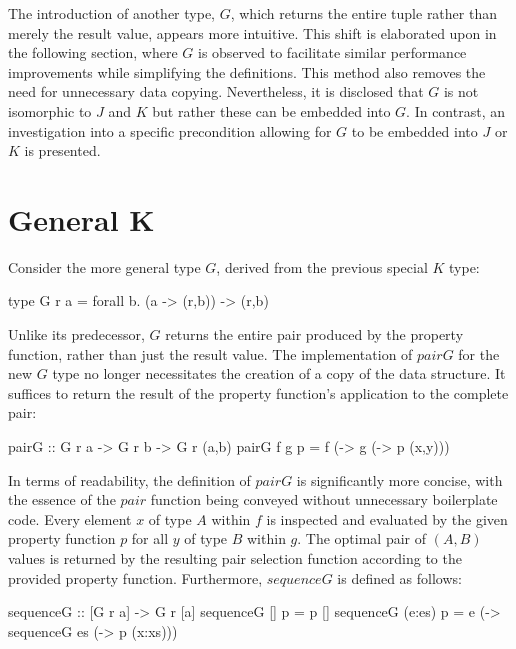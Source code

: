 \documentclass[runningheads]{llncs}
\begin{document}
\qquad The introduction of another type, \(G\), which returns the entire
tuple rather than merely the result value, appears more intuitive. This
shift is elaborated upon in the following section, where \(G\) is
observed to facilitate similar performance improvements while
simplifying the definitions. This method also removes the need for
unnecessary data copying. Nevertheless, it is disclosed that \(G\) is
not isomorphic to \(J\) and \(K\) but rather these can be embedded into
\(G\). In contrast, an investigation into a specific precondition
allowing for \(G\) to be embedded into \(J\) or \(K\) is presented.

\section{General K}\label{general-k}

Consider the more general type \(G\), derived from the previous special
\(K\) type:

\begin{code}
type G r a = forall b. (a -> (r,b)) -> (r,b)
\end{code}

Unlike its predecessor, \(G\) returns the entire pair produced by the
property function, rather than just the result value. The implementation
of \(pairG\) for the new \(G\) type no longer necessitates the creation
of a copy of the data structure. It suffices to return the result of the
property function's application to the complete pair:

\begin{code}
pairG :: G r a -> G r b -> G r (a,b)
pairG f g p = f (\x -> g (\y -> p (x,y)))
\end{code}

In terms of readability, the definition of \(pairG\) is significantly
more concise, with the essence of the \(pair\) function being conveyed
without unnecessary boilerplate code. Every element \(x\) of type \(A\)
within \(f\) is inspected and evaluated by the given property function
\(p\) for all \(y\) of type \(B\) within \(g\). The optimal pair of
\((A,B)\) values is returned by the resulting pair selection function
according to the provided property function. Furthermore, \(sequenceG\)
is defined as follows:

\begin{code}
sequenceG :: [G r a] -> G r [a]
sequenceG [] p     = p []
sequenceG (e:es) p = e (\x  -> sequenceG es 
                       (\xs -> p (x:xs)))
\end{code}
\end{document}
